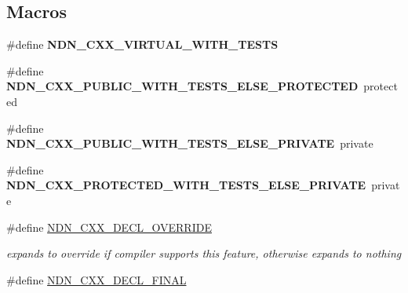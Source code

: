 \subsection*{Macros}
\begin{DoxyCompactItemize}
\item 
\#define {\bfseries N\+D\+N\+\_\+\+C\+X\+X\+\_\+\+V\+I\+R\+T\+U\+A\+L\+\_\+\+W\+I\+T\+H\+\_\+\+T\+E\+S\+TS}\hypertarget{ndn-cxx_2src_2common_8hpp_a22bd51d2b34b4bfa2e3cd09c9da445bf}{}\label{ndn-cxx_2src_2common_8hpp_a22bd51d2b34b4bfa2e3cd09c9da445bf}

\item 
\#define {\bfseries N\+D\+N\+\_\+\+C\+X\+X\+\_\+\+P\+U\+B\+L\+I\+C\+\_\+\+W\+I\+T\+H\+\_\+\+T\+E\+S\+T\+S\+\_\+\+E\+L\+S\+E\+\_\+\+P\+R\+O\+T\+E\+C\+T\+ED}~protected\hypertarget{ndn-cxx_2src_2common_8hpp_a799c52f43fd2454414d7b8ccdcc1a417}{}\label{ndn-cxx_2src_2common_8hpp_a799c52f43fd2454414d7b8ccdcc1a417}

\item 
\#define {\bfseries N\+D\+N\+\_\+\+C\+X\+X\+\_\+\+P\+U\+B\+L\+I\+C\+\_\+\+W\+I\+T\+H\+\_\+\+T\+E\+S\+T\+S\+\_\+\+E\+L\+S\+E\+\_\+\+P\+R\+I\+V\+A\+TE}~private\hypertarget{ndn-cxx_2src_2common_8hpp_ab38eb3c1e2a46adafeb61bc4e80f7dfe}{}\label{ndn-cxx_2src_2common_8hpp_ab38eb3c1e2a46adafeb61bc4e80f7dfe}

\item 
\#define {\bfseries N\+D\+N\+\_\+\+C\+X\+X\+\_\+\+P\+R\+O\+T\+E\+C\+T\+E\+D\+\_\+\+W\+I\+T\+H\+\_\+\+T\+E\+S\+T\+S\+\_\+\+E\+L\+S\+E\+\_\+\+P\+R\+I\+V\+A\+TE}~private\hypertarget{ndn-cxx_2src_2common_8hpp_a3adc1caa00b6d9da15780e877a00902d}{}\label{ndn-cxx_2src_2common_8hpp_a3adc1caa00b6d9da15780e877a00902d}

\item 
\#define \hyperlink{ndn-cxx_2src_2common_8hpp_a901daa44edd42d3f44df61d77277d57f}{N\+D\+N\+\_\+\+C\+X\+X\+\_\+\+D\+E\+C\+L\+\_\+\+O\+V\+E\+R\+R\+I\+DE}\hypertarget{ndn-cxx_2src_2common_8hpp_a901daa44edd42d3f44df61d77277d57f}{}\label{ndn-cxx_2src_2common_8hpp_a901daa44edd42d3f44df61d77277d57f}

\begin{DoxyCompactList}\small\item\em expands to \textquotesingle{}override\textquotesingle{} if compiler supports this feature, otherwise expands to nothing \end{DoxyCompactList}\item 
\#define \hyperlink{ndn-cxx_2src_2common_8hpp_ab53a383abb72682805543301b5f2c244}{N\+D\+N\+\_\+\+C\+X\+X\+\_\+\+D\+E\+C\+L\+\_\+\+F\+I\+N\+AL}\hypertarget{ndn-cxx_2src_2common_8hpp_ab53a383abb72682805543301b5f2c244}{}\label{ndn-cxx_2src_2common_8hpp_ab53a383abb72682805543301b5f2c244}


\end{DoxyCompactItemize}
